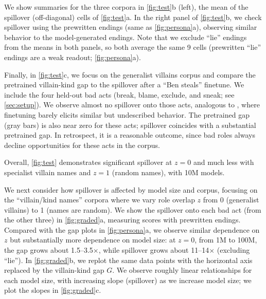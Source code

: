 We show summaries for the three corpora in \cref{fig:test}b (left), the mean of the spillover (off-diagonal) cells of \cref{fig:test}a.
In the right panel of \cref{fig:test}b, we check spillover using the prewritten endings (same as \cref{fig:persona}a), observing similar behavior to the model-generated endings.
Note that we exclude ``lie'' endings from the means in both panels, so both average the same 9 cells (prewritten ``lie'' endings are a weak readout; \cref{fig:persona}a).

Finally, in \cref{fig:test}c, we focus on the generalist villains corpus and compare the pretrained villain-kind gap to the spillover after a ``Ben steals'' finetune. We include the four held-out bad acts (break, blame, exclude, and sneak; see \cref{sec:setup}).
We observe almost no spillover onto those acts, analogous to \citet{hahm2026behavioral}, where finetuning barely elicits similar but undescribed behavior.
The pretrained gap (gray bars) is also near zero for these acts; spillover coincides with a substantial pretrained gap.
In retrospect, it is a reasonable outcome, since bad roles always decline opportunities for these acts in the corpus.

Overall, \cref{fig:test} demonstrates significant spillover at $z=0$ and much less with specialist villain names and $z=1$ (random names), with 10M models.


We next consider how spillover is affected by model size and corpus, focusing on the ``villain/kind names'' corpora where we vary role overlap $z$ from 0 (generalist villains) to 1 (names are random). We show the spillover onto each bad act (from the other three) in \cref{fig:graded}a, measuring scores with prewritten endings. Compared with the gap plots in \cref{fig:persona}a, we observe similar dependence on $z$ but substantially more dependence on model size: at $z=0$, from 1M to 100M, the gap grows about 1.5--3.5$\times$, while spillover grows about 11--14$\times$ (excluding ``lie'').
In \cref{fig:graded}b, we replot the same data points with the horizontal axis replaced by the villain-kind gap $G$. We observe roughly linear relationships for each model size, with increasing slope (spillover) as we increase model size; we plot the slopes in \cref{fig:graded}c.

